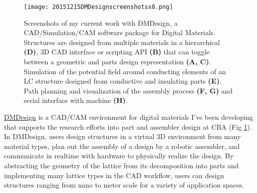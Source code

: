 {\begin{figure}
  \texttt{[image: 20151215DMDesignscreenshotsx8.png]}
  \caption{Screenshots of my current work with DMDesign, a CAD/Simulation/CAM software package for Digital Materials. Structures are designed from multiple materials in a hierarchical \textbf{(D)}, 3D CAD interface or scripting API \textbf{(B)} that can toggle between a geometric and parts design representation \textbf{(A, C)}. Simulation of the potential field around conducting elements of an LC structure designed from conductive and insulating parts \textbf{(E)}. Path planning and visualization of the assembly process \textbf{(F, G)} and serial interface with machine \textbf{(H)}.}
  \label{fig: designAssemblyGUIWide}
\end{figure}
\href{http://dma.cba.mit.edu/dmdesign/}{DMDesign} is a CAD/CAM environment for digital materials I've been developing that supports the research efforts into part and assembler design at CBA (Fig \ref{fig: designAssemblyGUIWide}).  In DMDesign, users design structures in a virtual 3D environment from many material types, plan out the assembly of a design by a robotic assembler, and communicate in realtime with hardware to physically realize the design.  By abstracting the geometry of the lattice from its decomposition into parts and implementing many lattice types in the CAD workflow, users can design structures ranging from nano to meter scale for a variety of application spaces.

}
